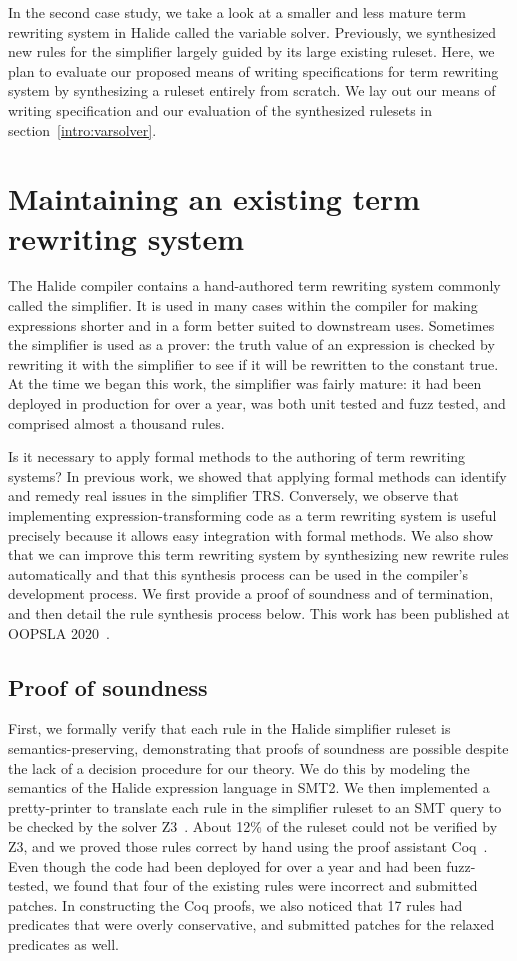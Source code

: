 In the second case study, we take a look at a smaller and less mature term rewriting system in Halide called the variable solver. Previously, we synthesized new rules for the simplifier largely guided by its large existing ruleset. Here, we plan to evaluate our proposed means of writing specifications for term rewriting system by synthesizing a ruleset entirely from scratch. We lay out our means of writing specification and our evaluation of the synthesized rulesets in section~\ref{intro:varsolver}.

\section{Maintaining an existing term rewriting system}
\label{sec:prior}

The Halide compiler contains a hand-authored term rewriting system commonly called the simplifier. It is used in many cases within the compiler for making expressions shorter and in a form better suited to downstream uses. Sometimes the simplifier is used as a prover: the truth value of an expression is checked by rewriting it with the simplifier to see if it will be rewritten to the constant true. At the time we began this work, the simplifier was fairly mature: it had been deployed in production for over a year, was both unit tested and fuzz tested, and comprised almost a thousand rules.

Is it necessary to apply formal methods to the authoring of term rewriting systems? In previous work, we showed that applying formal methods can identify and remedy real issues in the simplifier TRS. Conversely, we observe that implementing expression-transforming code as a term rewriting system is useful precisely because it allows easy integration with formal methods. We also show that we can improve this term rewriting system by synthesizing new rewrite rules automatically and that this synthesis process can be used in the compiler's development process. We first provide a proof of soundness and of termination, and then detail the rule synthesis process below. This work has been published at OOPSLA 2020~\citep{newcomb2020verifying}.

\subsection{Proof of soundness}
First, we formally verify that each rule in the Halide simplifier ruleset is semantics-preserving, demonstrating that proofs of soundness are possible despite the lack of a 
decision procedure for our theory. We do this by modeling the semantics of the Halide expression language in SMT2. We then implemented a pretty-printer to translate each rule in the simplifier ruleset to an SMT query to be checked by the solver Z3~\citep{de2008z3}. About 12\% of the ruleset could not be verified by Z3, and we proved those rules correct by hand using the proof assistant Coq~\citep{Coq19}. Even though the code had been deployed for over a year and had been fuzz-tested, we found that four of the existing rules were incorrect and submitted patches. In constructing the Coq proofs, we also noticed that 17 rules had predicates that were overly conservative, and submitted patches for the relaxed predicates as well.

